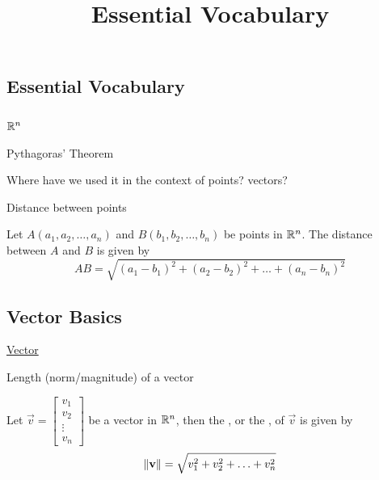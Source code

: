 \documentclass{ximera}
\title{Essential Vocabulary} \license{CC BY-NC-SA 4.0}
\begin{document}
\begin{abstract}
\end{abstract}
\maketitle


\begin{onlineOnly}
\section*{Essential Vocabulary}
\end{onlineOnly}

\subsection{$\mathbb{R}^n$}

Pythagoras’ Theorem
\begin{expandable}
    Where have we used it in the context of points? 
 vectors?
\end{expandable}

Distance between points 
\begin{expandable}
Let $A(a_1, a_2,\ldots ,a_n)$ and $B(b_1, b_2,\ldots ,b_n)$ be points in $\mathbb{R}^n$.  The distance between $A$ and $B$ is given by
$$AB=\sqrt{(a_1-b_1)^2+(a_2-b_2)^2+\ldots +(a_n-b_n)^2}$$
\end{expandable}

\subsection{Vector Basics}
\href{https://ximera.osu.edu/oerlinalg/LinearAlgebra/VEC-0010/main}{Vector}

Length (norm/magnitude) of a vector
\begin{expandable}
Let $\vec{v}=\begin{bmatrix}v_1\\ v_2\\ \vdots \\v_n\end{bmatrix}$ be a vector in $\mathbb{R}^n$, then the , or the , of $\vec{v}$ is given by
$$  \left\lVert\mathbf{v}\right\rVert=\sqrt{v_1^2+v_2^2+\ldots +v_n^2}$$
\end{expandable}
\end{document}
